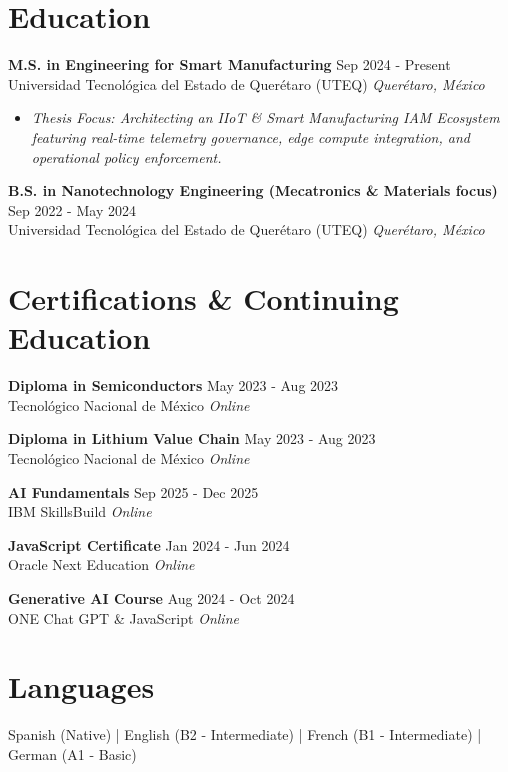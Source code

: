 \documentclass[10pt,a4paper]{article}
\newcommand{\eduexp}[4]{
    \textbf{#1} \hfill #2\\
    \textcolor{primary}{#3} \hfill \textit{#4}\vspace{5pt}
    \vspace{4pt}
}
\begin{document}
\section*{Education}
\eduexp{M.S. in Engineering for Smart Manufacturing}{Sep 2024 - Present}{Universidad Tecnológica del Estado de Querétaro (UTEQ)}{Querétaro, México}
\begin{itemize}[leftmargin=*,nosep]
    \item \textit{Thesis Focus: Architecting an IIoT \& Smart Manufacturing IAM Ecosystem featuring real-time telemetry governance, edge compute integration, and operational policy enforcement.}
\end{itemize}
\vspace{4pt}

\eduexp{B.S. in Nanotechnology Engineering (Mecatronics \& Materials focus)}{Sep 2022 - May 2024}{Universidad Tecnológica del Estado de Querétaro (UTEQ)}{Querétaro, México}

\section*{Certifications \& Continuing Education}

\eduexp{Diploma in Semiconductors}{May 2023 - Aug 2023}{Tecnológico Nacional de México}{Online}

\eduexp{Diploma in Lithium Value Chain}{May 2023 - Aug 2023}{Tecnológico Nacional de México}{Online}

\eduexp{AI Fundamentals}{Sep 2025 - Dec 2025}{IBM SkillsBuild}{Online}

\eduexp{JavaScript Certificate}{Jan 2024 - Jun 2024}{Oracle Next Education}{Online}

\eduexp{Generative AI Course}{Aug 2024 - Oct 2024}{ONE Chat GPT \& JavaScript}{Online}

\section*{Languages} 
Spanish (Native) \hfill | \hfill English (B2 - Intermediate) \hfill| \hfill French (B1 - Intermediate) \hfill | \hfill German (A1 - Basic)
\end{document}
